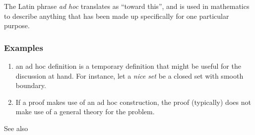 \documentclass[12pt]{article}
\begin{document}
The Latin phrase \emph{ad hoc} translates as ``toward this'', and is used in mathematics to describe anything that has been made up specifically for one particular purpose.

\subsubsection*{Examples}
\begin{enumerate}
\item an ad hoc definition is a temporary definition that might
be useful for the discussion at hand. For instance, let a \emph{nice set} 
be a closed set with smooth boundary. 
\item If a proof makes use of an ad hoc construction,  the proof
(typically) does not make use of a general theory for the problem. 
\end{enumerate}

See also
\end{document}
